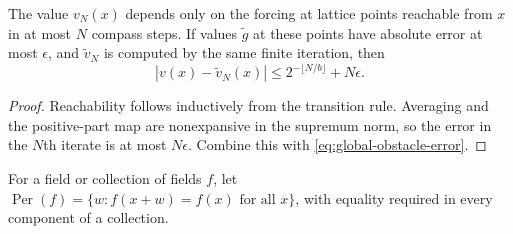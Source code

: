 \begin{corollary}
\label{cor:global-field-locality}
The value $v_N(x)$ depends only on the forcing at lattice points
reachable from $x$ in at most $N$ compass steps. If values
$\widetilde g$ at these points have absolute error at most $\epsilon$,
and $\widetilde v_N$ is computed by the same finite iteration, then
\begin{equation}\label{eq:global-field-locality}
 |v(x)-\widetilde v_N(x)|
             \le2^{-\lfloor N/b\rfloor}+N\epsilon.
\end{equation}
\end{corollary}
\begin{proof}
Reachability follows inductively from the transition rule. Averaging
and the positive-part map are nonexpansive in the supremum norm, so
the error in the $N$th iterate is at most $N\epsilon$. Combine this
with \eqref{eq:global-obstacle-error}.
\end{proof}

For a field or collection of fields $f$, let
$\operatorname{Per}(f)=\{w:f(x+w)=f(x)\text{ for all }x\}$, with
equality required in every component of a collection.

